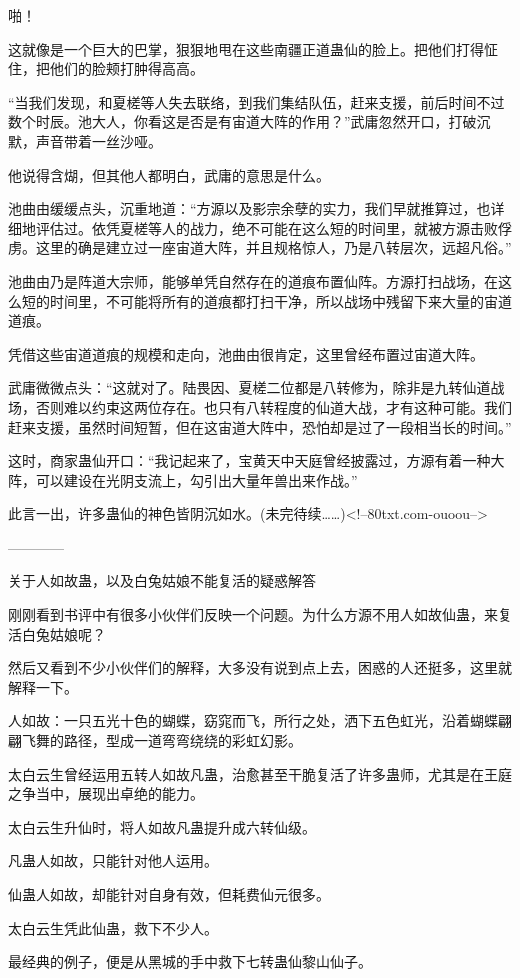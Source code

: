 \begin{this_body}
啪！

这就像是一个巨大的巴掌，狠狠地甩在这些南疆正道蛊仙的脸上。把他们打得怔住，把他们的脸颊打肿得高高。

“当我们发现，和夏槎等人失去联络，到我们集结队伍，赶来支援，前后时间不过数个时辰。池大人，你看这是否是有宙道大阵的作用？”武庸忽然开口，打破沉默，声音带着一丝沙哑。

他说得含煳，但其他人都明白，武庸的意思是什么。

池曲由缓缓点头，沉重地道：“方源以及影宗余孽的实力，我们早就推算过，也详细地评估过。依凭夏槎等人的战力，绝不可能在这么短的时间里，就被方源击败俘虏。这里的确是建立过一座宙道大阵，并且规格惊人，乃是八转层次，远超凡俗。”

池曲由乃是阵道大宗师，能够单凭自然存在的道痕布置仙阵。方源打扫战场，在这么短的时间里，不可能将所有的道痕都打扫干净，所以战场中残留下来大量的宙道道痕。

凭借这些宙道道痕的规模和走向，池曲由很肯定，这里曾经布置过宙道大阵。

武庸微微点头：“这就对了。陆畏因、夏槎二位都是八转修为，除非是九转仙道战场，否则难以约束这两位存在。也只有八转程度的仙道大战，才有这种可能。我们赶来支援，虽然时间短暂，但在这宙道大阵中，恐怕却是过了一段相当长的时间。”

这时，商家蛊仙开口：“我记起来了，宝黄天中天庭曾经披露过，方源有着一种大阵，可以建设在光阴支流上，勾引出大量年兽出来作战。”

此言一出，许多蛊仙的神色皆阴沉如水。(未完待续……)<!--80txt.com-ouoou-->

------------

关于人如故蛊，以及白兔姑娘不能复活的疑惑解答

刚刚看到书评中有很多小伙伴们反映一个问题。为什么方源不用人如故仙蛊，来复活白兔姑娘呢？

然后又看到不少小伙伴们的解释，大多没有说到点上去，困惑的人还挺多，这里就解释一下。

人如故：一只五光十色的蝴蝶，窈窕而飞，所行之处，洒下五色虹光，沿着蝴蝶翩翩飞舞的路径，型成一道弯弯绕绕的彩虹幻影。

太白云生曾经运用五转人如故凡蛊，治愈甚至干脆复活了许多蛊师，尤其是在王庭之争当中，展现出卓绝的能力。

太白云生升仙时，将人如故凡蛊提升成六转仙级。

凡蛊人如故，只能针对他人运用。

仙蛊人如故，却能针对自身有效，但耗费仙元很多。

太白云生凭此仙蛊，救下不少人。

最经典的例子，便是从黑城的手中救下七转蛊仙黎山仙子。


\end{this_body}
